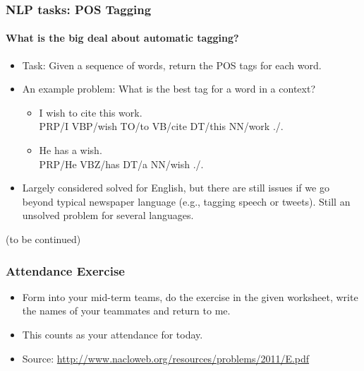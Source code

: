 \documentclass{beamer}
\begin{document}
\begin{frame}
\frametitle{NLP tasks: POS Tagging}
\framesubtitle{What is the big deal about automatic tagging?}
\begin{itemize}
\item Task: Given a sequence of words, return the POS tags for each word.
\item An example problem: What is the best tag for a word in a context?
\begin{itemize}
\item I wish to cite this work. 
\\ PRP/I  VBP/wish  TO/to  VB/cite  DT/this  NN/work ./.
\item He has a wish.
\\ PRP/He  VBZ/has  DT/a  NN/wish ./. 
\end{itemize}
\item Largely considered solved for English, but there are still issues if we go beyond typical newspaper language (e.g., tagging speech or tweets). Still an unsolved problem for several languages.
\end{itemize}
(to be continued)
\end{frame}

\begin{frame}
\frametitle{Attendance Exercise}
\begin{itemize}
\item Form into your mid-term teams, do the exercise in the given worksheet, write the names of your teammates and return to me.
\item This counts as your attendance for today. 
\item Source: \url{http://www.nacloweb.org/resources/problems/2011/E.pdf}
\end{itemize}
\end{frame}
\end{document}
